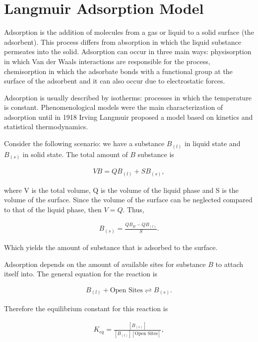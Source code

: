 \section{Langmuir Adsorption Model}

Adsorption is the addition of molecules from a gas or liquid to a solid surface (the adsorbent). This process differs from absorption in which the liquid substance permeates into the solid. Adsorption can occur in three main ways: physisorption in which Van der Waals interactions are responsible for the process, chemisorption in which the adsorbate bonds with a functional group at the surface of the adsorbent and it can also occur due to electrostatic forces.

Adsorption is usually described by isotherms: processes in which the temperature is constant. Phenomenological models were the main characterization of adsorption until in 1918 Irving Langmuir proposed a model based on kinetics and statistical thermodynamics.

Consider the following scenario: we have a substance $B_{(l)}$ in liquid state and $B_{(s)}$ in solid state. The total amount of $B$ substance is

\begin{align}
	VB = QB_{(l)} + S B_{(s)},
\end{align}

where V is the total volume, Q is the volume of the liquid phase and S is the volume of the surface. Since the volume of the surface can be neglected compared to that of the liquid phase, then $V = Q$. Thus,

\begin{align}
	B_{(s)} = \frac{QB_B - QB_{(l)}}{S}.
\end{align}

Which yields the amount of substance that is adsorbed to the surface. 

Adsorption depends on the amount of available sites for substance $B$ to attach itself into. The general equation for the reaction is

\begin{align}
	B_{(l)} + \text{Open Sites} \rightleftharpoons B_{(s)}.
\end{align} 

Therefore the equilibrium constant for this reaction is

\begin{align}
	K_{eq} = \frac{[B_{(s)}]}{[B_{(l)}][\text{Open Sites}]},
\end{align}

